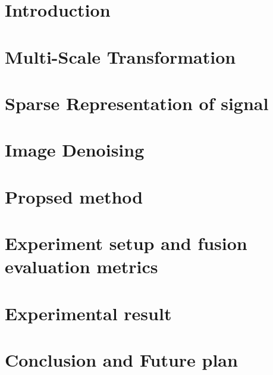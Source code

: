 \documentclass[12pt]{report}
\theoremstyle{plain}
\theoremstyle{definition}
\begin{document}
\tableofcontents
\listoffigures
{}
\listoftables
{}


\chapter{Introduction}
\setcounter{page}{2}


\chapter{Multi-Scale Transformation}


\chapter{Sparse Representation of signal}


\chapter{Image Denoising}


\chapter{Propsed method}


\chapter{Experiment setup and fusion evaluation metrics}


\chapter{Experimental result}


\chapter{Conclusion and Future plan}


%
\end{document}
